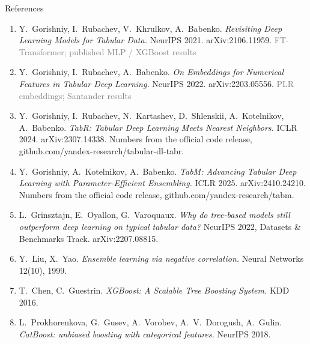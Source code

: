 \documentclass[aspectratio=169, xcolor=table]{beamer}
\begin{document}
\begin{frame}{References}
    \scriptsize
    \begin{enumerate}
        \setlength\itemsep{0.35em}
        \item[{[1]}] Y.~Gorishniy, I.~Rubachev, V.~Khrulkov, A.~Babenko. \textit{Revisiting Deep Learning Models for Tabular Data.} NeurIPS 2021. arXiv:2106.11959. \hfill\textcolor{gray}{FT-Transformer; published MLP / XGBoost results}
        \item[{[2]}] Y.~Gorishniy, I.~Rubachev, A.~Babenko. \textit{On Embeddings for Numerical Features in Tabular Deep Learning.} NeurIPS 2022. arXiv:2203.05556. \hfill\textcolor{gray}{PLR embeddings; Santander results}
        \item[{[3]}] Y.~Gorishniy, I.~Rubachev, N.~Kartashev, D.~Shlenskii, A.~Kotelnikov, A.~Babenko. \textit{TabR: Tabular Deep Learning Meets Nearest Neighbors.} ICLR 2024. arXiv:2307.14338. Numbers from the official code release, github.com/yandex-research/tabular-dl-tabr.
        \item[{[4]}] Y.~Gorishniy, A.~Kotelnikov, A.~Babenko. \textit{TabM: Advancing Tabular Deep Learning with Parameter-Efficient Ensembling.} ICLR 2025. arXiv:2410.24210. Numbers from the official code release, github.com/yandex-research/tabm.
        \item[{[5]}] L.~Grinsztajn, E.~Oyallon, G.~Varoquaux. \textit{Why do tree-based models still outperform deep learning on typical tabular data?} NeurIPS 2022, Datasets \& Benchmarks Track. arXiv:2207.08815.
        \item[{[6]}] Y.~Liu, X.~Yao. \textit{Ensemble learning via negative correlation.} Neural Networks 12(10), 1999.
        \item[{[7]}] T.~Chen, C.~Guestrin. \textit{XGBoost: A Scalable Tree Boosting System.} KDD 2016.
        \item[{[8]}] L.~Prokhorenkova, G.~Gusev, A.~Vorobev, A.~V.~Dorogush, A.~Gulin. \textit{CatBoost: unbiased boosting with categorical features.} NeurIPS 2018.
    \end{enumerate}
\end{frame}
\end{document}
